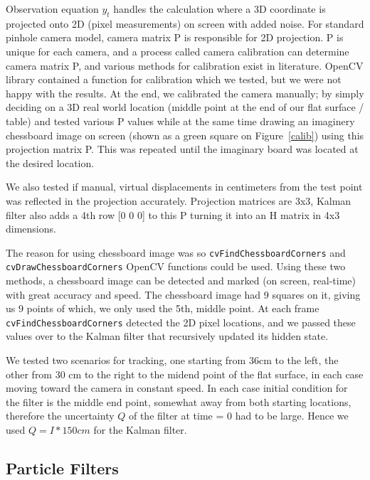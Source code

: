 \documentclass[11pt]{article}
\begin{document}
Observation equation $y_t$ handles the calculation where a 3D coordinate is
projected onto 2D (pixel measurements) on screen with added noise. For standard
pinhole camera model, camera matrix P is responsible for 2D projection. P is
unique for each camera, and a process called camera calibration can determine
camera matrix P, and various methods for calibration exist in literature. OpenCV
library contained a function for calibration which we tested, but we were not
happy with the results. At the end, we calibrated the camera manually; by simply
deciding on a 3D real world location (middle point at the end of our flat
surface / table) and tested various P values while at the same time drawing an
imaginery chessboard image on screen (shown as a green square on
Figure~\ref{calib}) using this projection matrix P. This was repeated until the
imaginary board was located at the desired location.


We also tested if manual, virtual displacements in centimeters from the test
point was reflected in the projection accurately. Projection matrices are 3x3,
Kalman filter also adds a 4th row [0 0 0] to this P turning it into an H matrix
in 4x3 dimensions.

The reason for using chessboard image was so \verb!cvFindChessboardCorners!
and \verb!cvDrawChessboardCorners! OpenCV functions could be used. Using
these two methods, a chessboard image can be detected and marked (on
screen, real-time) with great accuracy and speed. The chessboard image had
9 squares on it, giving us 9 points of which, we only used the 5th, middle
point. At each frame \verb!cvFindChessboardCorners! detected the 2D pixel
locations, and we passed these values over to the Kalman filter that
recursively updated its hidden state.

We tested two scenarios for tracking, one starting from 36cm to the left, the
other from 30 cm to the right to the midend point of the flat surface, in each
case moving toward the camera in constant speed. In each case initial condition
for the filter is the middle end point, somewhat away from both starting
locations, therefore the uncertainty $Q$ of the filter at time = 0 had to be
large. Hence we used $Q = I*150cm$ for the Kalman filter. 

\subsection{Particle Filters}
\end{document}
